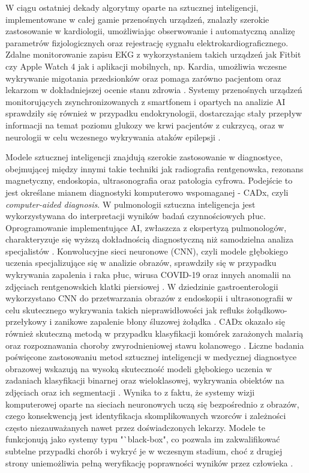 W ciągu ostatniej dekady algorytmy oparte na sztucznej inteligencji, implementowane w całej gamie przenośnych urządzeń, znalazły szerokie zastosowanie w kardiologii, umożliwiając obserwowanie i automatyczną analizę parametrów fizjologicznych oraz rejestrację sygnału elektrokardiograficznego.
Zdalne monitorowanie zapisu EKG z wykorzystaniem takich urządzeń jak Fitbit czy Apple Watch 4 jak i aplikacji mobilnych, np. Kardia, umożliwia wczesne wykrywanie migotania przedsionków oraz pomaga zarówno pacjentom oraz lekarzom w dokładniejszej ocenie stanu zdrowia \cite{amisha_overview_2019, briganti_artificial_2020, halcox_assessment_2017}.
Systemy przenośnych urządzeń monitorujących zsynchronizowanych z smartfonem i opartych na analizie AI sprawdziły się również w przypadku endokrynologii, dostarczając stały przepływ informacji na temat poziomu glukozy we krwi pacjentów z cukrzycą, oraz w neurologii w celu wczesnego wykrywania ataków epilepsji \cite{briganti_artificial_2020}.

Modele sztucznej inteligencji znajdują szerokie zastosowanie w diagnostyce, obejmującej między innymi takie techniki jak radiografia rentgenowska, rezonans magnetyczny, endoskopia, ultrasonografia oraz patologia cyfrowa.
Podejście to jest określane mianem diagnostyki komputerowo wspomaganej - CADx, czyli \textit{computer-aided diagnosis}.
W pulmonologii sztuczna inteligencja jest wykorzystywana do interpretacji wyników badań czynnościowych płuc.
Oprogramowanie implementujące AI, zwłaszcza z ekspertyzą pulmonologów, charakteryzuje się wyższą dokładnością diagnostyczną niż samodzielna analiza specjalistów \cite{das_collaboration_2023, topalovic_artificial_2019}.
Konwolucyjne sieci neuronowe (CNN), czyli modele głębokiego uczenia specjalizujące się w analizie obrazów, sprawdziły się w przypadku wykrywania zapalenia i raka płuc, wirusa COVID-19 oraz innych anomalii na zdjęciach rentgenowskich klatki piersiowej \cite{rajaraman_visualization_2018, ismael_deep_2021, hussain_corodet_2021, lee_validation_2023}.
W dziedzinie gastroenterologii wykorzystano CNN do przetwarzania obrazów z endoskopii i ultrasonografii w celu skutecznego wykrywania takich nieprawidłowości jak refluks żołądkowo-przełykowy i zanikowe zapalenie błony śluzowej żołądka \cite{briganti_artificial_2020, yang_application_2019}.
CADx okazało się również skuteczną metodą w przypadku klasyfikacji komórek zarażonych malarią oraz rozpoznawania choroby zwyrodnieniowej stawu kolanowego \cite{rajaraman_pre-trained_2018, adaptive_2023}. 
Liczne badania poświęcone zastosowaniu metod sztucznej inteligencji w medycznej diagnostyce obrazowej wskazują na wysoką skuteczność modeli głębokiego uczenia w zadaniach klasyfikacji binarnej oraz wieloklasowej, wykrywania obiektów na zdjęciach oraz ich segmentacji \cite{ais.2021.15}.
Wynika to z faktu, że systemy wizji komputerowej oparte na sieciach neuronowych uczą się bezpośrednio z obrazów, czego konsekwencją jest identyfikacja skomplikowanych wzorców i zależności często niezauważanych nawet przez doświadczonych lekarzy.
Modele te funkcjonują jako systemy typu "`black-box", co pozwala im zakwalifikować subtelne przypadki chorób i wykryć je w wczesnym stadium, choć z drugiej strony uniemożliwia pełną weryfikację poprawności wyników przez człowieka \cite{lidstromer_artificial_2021}. 

